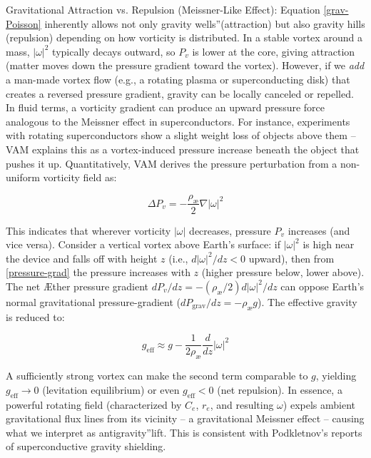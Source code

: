 \documentclass[a4paper,12pt]{article}
\begin{document}
Gravitational Attraction vs. Repulsion (Meissner-Like Effect): Equation \eqref{grav-Poisson} inherently allows not only gravity \grqq wells\textquotedblright (attraction) but also gravity hills (repulsion) depending on how vorticity is distributed. In a stable vortex around a mass, $|\omega|^2$ typically decays outward, so $P_v$ is lower at the core, giving attraction (matter moves down the pressure gradient toward the vortex). However, if we \textit{add} a man-made vortex flow (e.g., a rotating plasma or superconducting disk) that creates a reversed pressure gradient, gravity can be locally canceled or repelled. In fluid terms, a vorticity gradient can produce an upward pressure force analogous to the Meissner effect in superconductors. For instance, experiments with rotating superconductors show a slight weight loss of objects above them – VAM explains this as a vortex-induced pressure increase beneath the object that pushes it up. Quantitatively, VAM derives the pressure perturbation from a non-uniform vorticity field as:

\begin{equation}\label{pressure-grad}
\Delta P_v = -\frac{\rho_\text{\ae}}{2} \nabla |\omega|^2
\end{equation}

This indicates that wherever vorticity $|\omega|$ decreases, pressure $P_v$ increases (and vice versa). Consider a vertical vortex above Earth's surface: if $|\omega|^2$ is high near the device and falls off with height $z$ (i.e., $d|\omega|^2 / dz < 0$ upward), then from \eqref{pressure-grad} the pressure increases with $z$ (higher pressure below, lower above). The net Æther pressure gradient $dP_v / dz = -(\rho_\text{\ae} / 2) d|\omega|^2 / dz$ can oppose Earth's normal gravitational pressure-gradient ($dP_\text{grav} / dz = -\rho_\text{\ae} g$). The effective gravity is reduced to:

\begin{equation}\label{g-eff}
g_{\text{eff}} \approx g - \frac{1}{2 \rho_\text{\ae}} \frac{d}{dz} |\omega|^2
\end{equation}

A sufficiently strong vortex can make the second term comparable to $g$, yielding $g_{\text{eff}}\to0$ (levitation equilibrium) or even $g_{\text{eff}}<0$ (net repulsion). In essence, a powerful rotating field (characterized by $C_e$, $r_e$, and resulting $\omega$) expels ambient gravitational flux lines from its vicinity – a gravitational Meissner effect – causing what we interpret as \grqq antigravity\textquotedblright lift. This is consistent with Podkletnov's reports of superconductive gravity shielding.
\end{document}
